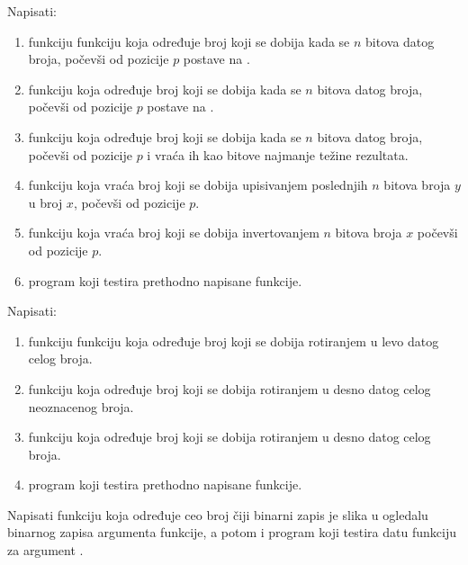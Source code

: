 \begin{Exercise}[label=204]
Napisati:
\begin{enumerate}
\item funkciju funkciju koja određuje broj koji se dobija kada se $n$ bitova datog broja, počevši od pozicije $p$ postave na .
\item funkciju koja određuje broj koji se dobija kada se $n$ bitova datog broja, počevši od pozicije $p$ postave na .
\item funkciju koja određuje broj koji se dobija kada se $n$ bitova datog broja, počevši od pozicije $p$ i vraća ih kao bitove najmanje težine rezultata.
\item funkciju koja vraća broj koji se dobija upisivanjem poslednjih $n$ bitova broja $y$ u broj $x$, počevši od pozicije $p$.
\item funkciju koja vraća broj koji se dobija invertovanjem $n$ bitova broja $x$ počevši od pozicije $p$.
\item program koji testira prethodno napisane funkcije.
\end{enumerate}
\end{Exercise}
\begin{Answer}[ref=204]
\end{Answer}


\begin{Exercise}[label=205]
Napisati:
\begin{enumerate}
\item funkciju funkciju koja određuje broj koji se dobija rotiranjem u levo datog celog broja.
\item funkciju koja određuje broj koji se dobija rotiranjem u desno datog celog neoznacenog broja. 
\item funkciju koja određuje broj koji se dobija rotiranjem u desno datog celog broja.
\item program koji testira prethodno napisane funkcije.
\end{enumerate}
\end{Exercise}
\begin{Answer}[ref=205]
\end{Answer}

\begin{Exercise}[label=206]
Napisati funkciju koja određuje ceo broj čiji binarni zapis je slika u ogledalu binarnog zapisa argumenta funkcije, a potom i program koji testira datu funkciju za argument .
\end{Exercise}
\begin{Answer}[ref=206]
\end{Answer}

